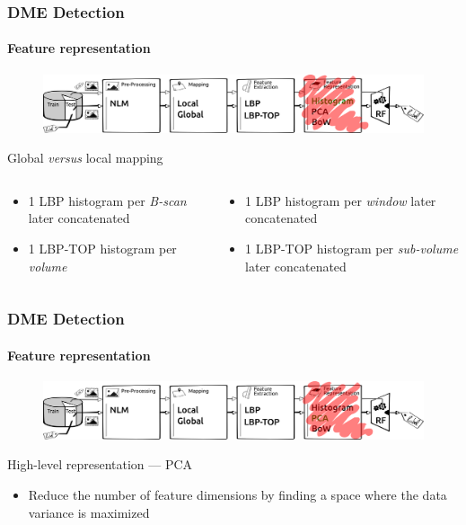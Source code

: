 \documentclass{beamer}
\begin{document}
\begin{frame}
  \frametitle{DME Detection}
  \framesubtitle{Feature representation}
  \begin{figure}
    \centering
    \includegraphics[width=.5\textwidth]{./images/ml-r1.png}
  \end{figure}
  \begin{block}{Global \textit{versus} local mapping}
    \begin{columns}
      \begin{column}{.5\linewidth}
        \begin{itemize}\footnotesize
        \item 1 LBP histogram per \emph{B-scan} later concatenated
        \item 1 LBP-TOP histogram per \emph{volume}
        \end{itemize}
      \end{column}
      \begin{column}{.5\linewidth}
        \begin{itemize}\footnotesize
        \item 1 LBP histogram per \emph{window} later concatenated
        \item 1 LBP-TOP histogram per \emph{sub-volume} later concatenated
        \end{itemize}
      \end{column}
    \end{columns}
  \end{block}
\end{frame}

\begin{frame}
  \frametitle{DME Detection}
  \framesubtitle{Feature representation}
  \begin{figure}
    \centering
    \includegraphics[width=.5\textwidth]{./images/ml-r2.png}
  \end{figure}
  \begin{block}{High-level representation --- PCA}
    \begin{itemize}\footnotesize
    \item Reduce the number of feature dimensions by finding a space where the data variance is maximized
    \end{itemize}
  \end{block}
\end{frame}
\end{document}
